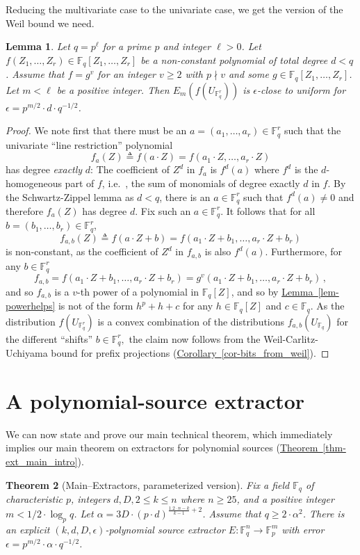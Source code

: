 \documentclass[10pt]{article}
\newtheorem{theorem}{Theorem}[section]
\newtheorem{lemma}[theorem]{Lemma}
\theoremstyle{definition}
\providecommand{\ie}{i.e.\ }
\numberwithin{equation}{section}
\newcommand{\expref}[2]{\texorpdfstring{\hyperref[#2]{#1~\ref{#2}}}{#1~\ref{#2}}}
\newcommand{\eps}{\epsilon}
\newcommand{\polyext}[4]{$(#1,#2,#3,#4)$-polynomial source extractor}
\newcommand{\F}{\mathbb F_q}
\begin{document}
Reducing the multivariate case to the univariate case, we get the version of the Weil bound we need.
\begin{lemma}\label{lem-multivariate_weil}
Let $q=p^{\ell}$ for a prime $p$ and integer $\ell>0$. Let $f(Z_1,\ldots,Z_r)\in \F[Z_1,\ldots,Z_r]$ be a
non-constant polynomial of total degree $d<q$.
Assume that $f= g^v$ for an integer $v\geq 2$ with
$p\nmid v$ and some $g\in \F[Z_1,\ldots,Z_r]$. Let $m<\ell $ be a positive integer.
Then $E_m(f(U_{\F^r}))$ is $\eps$-close to uniform for $\eps=p^{m/2}\cdot d\cdot q^{-1/2}$.
\end{lemma}
\begin{proof}
We note first that there must be an $a= (a_1,\ldots,a_r)\in \F^r$ such that the univariate ``line restriction'' polynomial
\[f_a(Z)\triangleq f(a\cdot Z ) = f(a_1\cdot Z,\ldots,a_r\cdot Z)\] has degree \emph{exactly} $d$: The coefficient
of $Z^d$ in $f_a$ is $f^d(a)$ where $f^d$ is the $d$-homogeneous part of $f$, \ie, the sum of monomials of degree
exactly $d$ in $f$. By the Schwartz-Zippel lemma as $d<q$, there is an $a\in \F^r$ such that $f^d(a)\neq 0$
and therefore $f_a(Z)$ has degree $d$.
Fix such an $a\in \F^r$.
It follows that for all $b = (b_1,\ldots,b_r) \in \F^r$,
\[f_{a,b}(Z)\triangleq
f(a\cdot Z+ b) = f(a_1\cdot Z + b_1,\ldots, a_r\cdot Z + b_r)\]
%
%
is non-constant, as the coefficient
%
of $Z^d$ in $f_{a,b}$ is also $f^d(a)$.
 Furthermore, for any $b\in \F^r$
\[f_{a,b}= f(a_1\cdot Z + b_1,\ldots, a_r\cdot Z + b_r)=
g^v(a_1\cdot Z + b_1,\ldots, a_r\cdot Z + b_r)\,,\]
and so $f_{a,b}$ is a
%
$v$-th
power of a polynomial in $\F[Z]$, and so
by \expref{Lemma}{lem-powerhelps} is not of the form $h^p + h + c$ for any $h\in \F[Z]$ and $c\in \F$.
As the distribution $f(U_{\F^r})$ is a convex combination of the distributions $f_{a,b}(U_{\F})$
for the different ``shifts'' $b\in\F^r,$ the claim now follows from the Weil-Carlitz-Uchiyama bound for prefix projections (\expref{Corollary}{cor-bits_from_weil}).
\end{proof}


%
%
\section{A polynomial-source extractor}\label{sec:extractor}

We can now state and prove our main technical theorem, which immediately implies our main theorem on extractors for polynomial sources (\expref{Theorem}{thm-ext_main_intro}).

\begin{theorem}[Main--Extractors, parameterized version]\label{thm-ext_main}
Fix a field $\F$ of characteristic $p$, integers $d,D,2\leq k\leq n$ where $n\geq 25$,
and a positive integer $m<1/2\cdot \log_p q$.
Let $\alpha=3 D \cdot (p\cdot d)^{\frac{1.2\cdot n-k}{k-1} +2} $. Assume that   $q\geq 2\cdot  \alpha^2$.
There is an explicit \polyext{k}{d}{D}{\eps}  $E:\F^n\to \mathbb{F}_p^m$ with error
$\eps =  p^{m/2}\cdot \alpha \cdot q^{-1/2}$.
\end{theorem}
\end{document}
